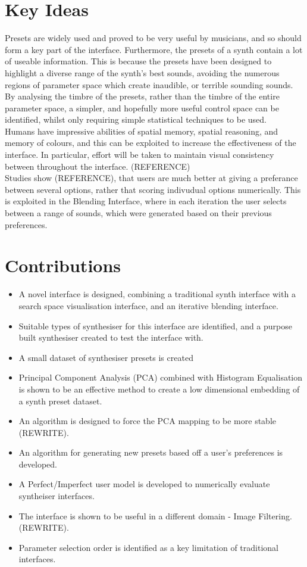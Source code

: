 \documentclass[11pt, oneside]{report}   	%
\begin{document}
\section{Key Ideas}
Presets are widely used and proved to be very useful by musicians, and so should form a key part of the interface. Furthermore, the presets of a synth contain a lot of useable information. This is because the presets have been designed to highlight a diverse range of the synth's best sounds, avoiding the numerous regions of parameter space which create inaudible, or terrible sounding sounds. By analysing the timbre of the presets, rather than the timbre of the entire parameter space, a simpler, and hopefully more useful control space can be identified, whilst only requiring simple statistical techniques to be used.\\
%
Humans have impressive abilities of spatial memory, spatial reasoning, and memory of colours, and this can be exploited to increase the effectiveness of the interface. In particular, effort will be taken to maintain visual consistency between throughout the interface. (REFERENCE)\\
%
Studies show (REFERENCE), that users are much better at giving a preferance between several options, rather that scoring indivudual options numerically. This is exploited in the Blending Interface, where in each iteration the user selects between a range of sounds, which were generated based on their previous preferences.
%
\section{Contributions}
\begin{itemize}
	\setlength\itemsep{-1.0em}
	\item A novel interface is designed, combining a traditional synth interface with a search space visualisation interface, and an iterative blending interface.
	\item Suitable types of synthesiser for this interface are identified, and a purpose built synthesiser created to test the interface with.
	\item A small dataset of synthesiser presets is created
	\item Principal Component Analysis (PCA) combined with Histogram Equalisation is shown to be an effective method to create a low dimensional embedding of a synth preset dataset.
	\item An algorithm is designed to force the PCA mapping to be more stable (REWRITE).
	\item An algorithm for generating new presets based off a user's preferences is developed.
	\item A Perfect/Imperfect user model is developed to numerically evaluate syntheiser interfaces.
	\item The interface is shown to be useful in a different domain - Image Filtering.(REWRITE).
	\item Parameter selection order is identified as a key limitation of traditional interfaces.
\end{itemize}
\end{document}
